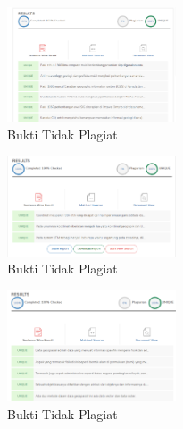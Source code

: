 \begin{figure}[H]
	\includegraphics[width=5cm]{figures/1174009/plagiat2.png}
	\centering
	\caption{Bukti Tidak Plagiat}
\end{figure}

\begin{figure}[H]
	\includegraphics[width=5cm]{figures/1174009/plagiat3.png}
	\centering
	\caption{Bukti Tidak Plagiat}
\end{figure}

\begin{figure}[H]
	\includegraphics[width=5cm]{figures/1174009/plagiat4.png}
	\centering
	\caption{Bukti Tidak Plagiat}
\end{figure}

